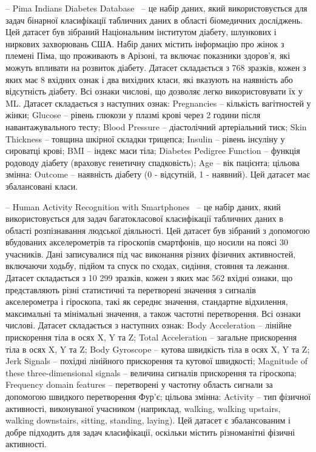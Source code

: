 -- Pima Indians Diabetes Database~\cite{ct30} -- це набір даних, який використовується для задач бінарної класифікації табличних даних в області біомедичних досліджень. Цей датасет був зібраний Національним інститутом діабету, шлункових і ниркових захворювань США. Набір даних містить інформацію про жінок з племені Піма, що проживають в Арізоні, та включає показники здоров'я, які можуть впливати на розвиток діабету. Датасет складається з 768 зразків, кожен з яких має 8 вхідних ознак і два вихідних класи, які вказують на наявність або відсутність діабету. Всі ознаки числові, що дозволяє легко використовувати їх у ML. Датасет складається з наступних ознак: Pregnancies -- кількість вагітностей у жінки; Glucose -- рівень глюкози у плазмі крові через 2 години після навантажувального тесту; Blood Pressure -- діастолічний артеріальний тиск; Skin Thickness -- товщина шкірної складки трицепса; Insulin -- рівень інсуліну у сироватці крові; BMI -- індекс маси тіла; Diabetes Pedigree Function -- функція родоводу діабету (враховує генетичну спадковість); Age -- вік пацієнта; цільова змінна: Outcome -- наявність діабету (0 - відсутній, 1 - наявний). Цей датасет має збалансовані класи.

-- Human Activity Recognition with Smartphones~\cite{ct31} -- це набір даних, який використовується для задач багатокласової класифікації табличних даних в області розпізнавання людської діяльності. Цей датасет був зібраний з допомогою вбудованих акселерометрів та гіроскопів смартфонів, що носили на поясі 30 учасників. Дані записувалися під час виконання різних фізичних активностей, включаючи ходьбу, підйом та спуск по сходах, сидіння, стояння та лежання. Датасет складається з 10 299 зразків, кожен з яких має 562 вхідні ознаки, що представляють різні статистичні та перетворені значення з сигналів акселерометра і гіроскопа, такі як середнє значення, стандартне відхилення, максимальні та мінімальні значення, а також частотні перетворення. Всі ознаки числові. Датасет складається з наступних ознак: Body Acceleration -- лінійне прискорення тіла в осях X, Y та Z; Total Acceleration -- загальне прискорення тіла в осях X, Y та Z; Body Gyroscope -- кутова швидкість тіла в осях X, Y та Z; Jerk Signals -- похідні лінійного прискорення та кутової швидкості; Magnitude of these three-dimensional signals -- величина сигналів прискорення та гіроскопа; Frequency domain features -- перетворені у частотну область сигнали за допомогою швидкого перетворення Фур'є; цільова змінна: Activity -- тип фізичної активності, виконуваної учасником (наприклад, walking, walking upstairs, walking downstairs, sitting, standing, laying). Цей датасет є збалансованим і добре підходить для задач класифікації, оскільки містить різноманітні фізичні активності.

